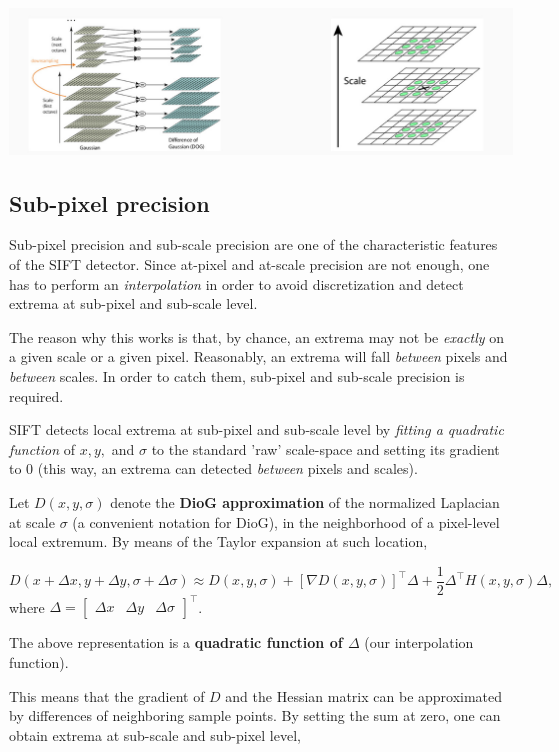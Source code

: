 \documentclass[10pt]{report}
\begin{document}
\begin{center}
\includegraphics[width=.9\linewidth]{./pics/det/sift-scale-space.jpg}
\end{center}

\subsection{Sub-pixel precision}
\label{sub-pixel-precision}
Sub-pixel precision and sub-scale precision are one of the
characteristic features of the SIFT detector. Since at-pixel and
at-scale precision are not enough, one has to perform an \emph{interpolation}
in order to avoid discretization and detect extrema at sub-pixel and
sub-scale level.

The reason why this works is that, by chance, an extrema may not be
\emph{exactly} on a given scale or a given pixel. Reasonably, an extrema will
fall \emph{between} pixels and \emph{between} scales. In order to catch them,
sub-pixel and sub-scale precision is required.

SIFT detects local extrema at sub-pixel and sub-scale level by \emph{fitting
a quadratic function} of \(x, y,\) and \(\sigma\) to the standard 'raw'
scale-space and setting its gradient to \(0\) (this way, an extrema can
detected \emph{between} pixels and scales).

Let \(D(x, y, \sigma)\) denote the \textbf{DioG approximation} of the
normalized Laplacian at scale \(\sigma\) (a convenient notation for
DioG), in the neighborhood of a pixel-level local extremum. By means of
the Taylor expansion at such location,

\[D(x + \Delta x, y + \Delta y, \sigma + \Delta \sigma) \approx D(x, y, \sigma) + [\nabla D(x, y, \sigma)]^\top \Delta + \frac{1}{2}\Delta^\top H(x, y, \sigma) \Delta,\] where \(\Delta = \begin{bmatrix}\Delta x & \Delta y & \Delta \sigma \end{bmatrix}^\top\).

The above representation is a \textbf{quadratic function of \(\Delta\)} (our
interpolation function).

This means that the gradient of \(D\) and the Hessian matrix can be
approximated by differences of neighboring sample points. By setting the
sum at zero, one can obtain extrema at sub-scale and sub-pixel level,
\end{document}
